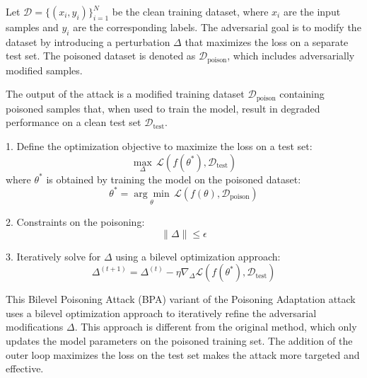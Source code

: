 Let \( \mathcal{D} = \{(x_i, y_i)\}_{i=1}^{N} \) be the clean training dataset, where \( x_i \) are the input samples and \( y_i \) are the corresponding labels. The adversarial goal is to modify the dataset by introducing a perturbation \( \Delta \) that maximizes the loss on a separate test set. The poisoned dataset is denoted as \( \mathcal{D}_{\text{poison}} \), which includes adversarially modified samples.

The output of the attack is a modified training dataset \( \mathcal{D}_{\text{poison}} \) containing poisoned samples that, when used to train the model, result in degraded performance on a clean test set \( \mathcal{D}_{\text{test}} \).


1. Define the optimization objective to maximize the loss on a test set:
\[
\max_{\Delta} \, \mathcal{L}(f(\theta^*), \mathcal{D}_{\text{test}})
\]
where $\theta^*$ is obtained by training the model on the poisoned dataset:
\[
\theta^* = \underset{\theta}{\arg \min} \, \mathcal{L}(f(\theta), \mathcal{D}_{\text{poison}})
\]

2. Constraints on the poisoning:
\[
\|\Delta\| \leq \epsilon
\]

3. Iteratively solve for $\Delta$ using a bilevel optimization approach:
\[
\Delta^{(t+1)} = \Delta^{(t)} - \eta \nabla_\Delta \mathcal{L}(f(\theta^*), \mathcal{D}_{\text{test}})
\]

This Bilevel Poisoning Attack (BPA) variant of the Poisoning Adaptation attack uses a bilevel optimization approach to iteratively refine the adversarial modifications $\Delta$. This approach is different from the original method, which only updates the model parameters on the poisoned training set. The addition of the outer loop maximizes the loss on the test set makes the attack more targeted and effective.